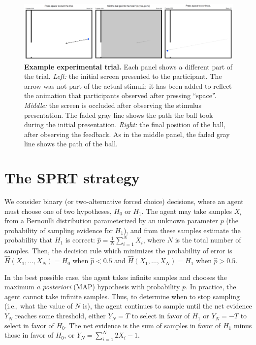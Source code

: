 \documentclass[10pt,letterpaper]{article}
\begin{document}
\begin{figure}[t!]
    \begin{center}
        \includegraphics[width=\textwidth]{figures/experiment.png}
        \caption{\textbf{Example experimental trial.} 
        Each panel shows a different part of the trial. 
        \emph{Left:} the initial screen presented to the participant.
        The arrow was not part of the actual stimuli; it has been added to reflect the animation that participants observed after pressing ``space''. 
        \emph{Middle:}  the screen is occluded after observing the stimulus presentation. 
        The faded gray line shows the path the ball took during the initial presentation. 
        \emph{Right:} the final position of the ball, after observing the feedback. 
        As in the middle panel, the faded gray line shows the path of the ball.}
        \label{fig:experiment}
    \end{center}
\end{figure}

\section{The SPRT strategy}

We consider binary (or two-alternative forced choice) decisions, where an agent must choose one of two hypotheses, $H_0$ or $H_1$. 
The agent may take samples $X_i$ from a Bernoulli distribution parameterized by an unknown parameter $p$ (the probability of sampling evidence for $H_1$), and from these samples estimate the probability that $H_1$ is correct: $\hat{p}=\frac{1}{N}\sum_{i=1}^N X_i$, where $N$ is the total number of samples. 
Then, the decision rule which minimizes the probability of error is $\hat{H}(X_1,\ldots{},X_N)=H_0$ when $\hat{p}<0.5$ and $\hat{H}(X_1,\ldots{},X_N)=H_1$ when $\hat{p}>0.5$.

In the best possible case, the agent takes infinite samples and chooses the maximum \emph{a posteriori} (MAP) hypothesis with probability $p$. 
In practice, the agent cannot take infinite samples. 
Thus, to determine when to stop sampling (i.e., what the value of $N$ is), the agent continues to sample until the net evidence $Y_N$ reaches some threshold, either $Y_N=T$ to select in favor of $H_1$ or $Y_N=-T$ to select in favor of $H_0$. 
The net evidence is the sum of samples in favor of $H_1$ minus those in favor of $H_0$, or $Y_N=\sum_{i=1}^N 2X_i-1$.
\end{document}
